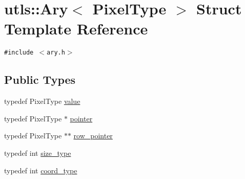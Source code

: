 \hypertarget{structutls_1_1Ary}{
\section{utls::Ary$<$ Pixel\-Type $>$ Struct Template Reference}
\label{structutls_1_1Ary}
}
{\tt \#include $<$ary.h$>$}

\subsection*{Public Types}
\begin{CompactItemize}
\item 
typedef Pixel\-Type \hyperlink{structutls_1_1Ary_551039ff12448ccd561c82108ed16190}{value}
\item 
typedef Pixel\-Type $\ast$ \hyperlink{structutls_1_1Ary_9eb735fe995ca9b5faaef9b176a08583}{pointer}
\item 
typedef Pixel\-Type $\ast$$\ast$ \hyperlink{structutls_1_1Ary_d8034949f0a70efaf950686c9cd7e7ea}{row\_\-pointer}
\item 
typedef int \hyperlink{structutls_1_1Ary_8811de4f35f83e989511aaddf003376c}{size\_\-type}
\item 
typedef int \hyperlink{structutls_1_1Ary_907420b899d180bd0ae87c3995316f18}{coord\_\-type}
\end{CompactItemize}
